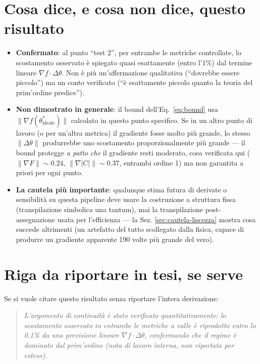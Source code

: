 \documentclass[11pt,a4paper]{article}
\begin{document}
\begin{center}
\end{center}

\section{Cosa dice, e cosa non dice, questo risultato}

\begin{itemize}[leftmargin=1.3em,itemsep=0.3em]
\item \textbf{Confermato}: al punto ``test 2'', per entrambe le metriche
controllate, lo scostamento osservato è spiegato quasi esattamente
(entro l'$1\%$) dal termine lineare $\nabla f\cdot\Delta\theta$. Non è
più un'affermazione qualitativa (``dovrebbe essere piccolo'') ma un
conto verificato (``è esattamente piccolo quanto la teoria del
prim'ordine predice'').
\item \textbf{Non dimostrato in generale}: il bound
dell'Eq.~\eqref{eq:bound} usa $\|\nabla f(\theta^*_\text{ideale})\|$
calcolato in questo punto specifico. Se in un altro punto di lavoro (o
per un'altra metrica) il gradiente fosse molto più grande, lo stesso
$\|\Delta\theta\|$ produrrebbe uno scostamento proporzionalmente più
grande --- il bound protegge \emph{a patto che} il gradiente resti
moderato, cosa verificata qui ($\|\nabla F\|\sim0.24$,
$\|\nabla|C|\|\sim0.37$, entrambi ordine 1) ma non garantita a priori per
ogni punto.
\item \textbf{La cautela più importante}: qualunque stima futura di
derivate o sensibilità su questa pipeline deve usare la costruzione a
struttura fissa (transpilazione simbolica una tantum), mai la
transpilazione post-assegnazione usata per l'efficienza --- la Sez.
\ref{sec:cautela-liscezza} mostra cosa succede altrimenti (un artefatto
del tutto scollegato dalla fisica, capace di produrre un gradiente
apparente 190 volte più grande del vero).
\end{itemize}

\section{Riga da riportare in tesi, se serve}

Se si vuole citare questo risultato senza riportare l'intera derivazione:
\begin{quote}
\emph{L'argomento di continuità è stato verificato quantitativamente: lo
scostamento osservato in entrambe le metriche a valle è riprodotto entro
lo 0.1\% da una previsione lineare $\nabla f\cdot\Delta\theta$, confermando
che il regime è dominato dal prim'ordine (nota di lavoro interna, non
riportata per esteso).}
\end{quote}
\end{document}
